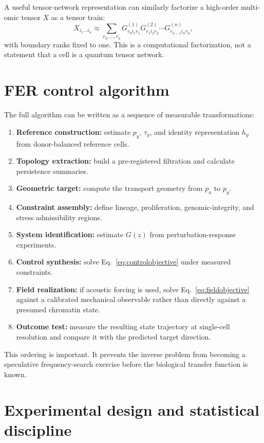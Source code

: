 \documentclass[11pt]{article}
\begin{document}
A useful tensor-network representation can similarly factorize a high-order multi-omic tensor $X$ as a tensor train:
\begin{equation}
 X_{i_1\ldots i_n}\approx\sum_{r_0,\ldots,r_n}G^{(1)}_{r_0i_1r_1}G^{(2)}_{r_1i_2r_2}\cdots G^{(n)}_{r_{n-1}i_nr_n},
\label{eq:tensortrain}
\end{equation}
with boundary ranks fixed to one. This is a computational factorization, not a statement that a cell is a quantum tensor network.

\section{FER control algorithm}
The full algorithm can be written as a sequence of measurable transformations:
\begin{enumerate}[leftmargin=1.45em]
\item \textbf{Reference construction:} estimate $p_y$, $\tau_y$, and identity representation $h_y$ from donor-balanced reference cells.
\item \textbf{Topology extraction:} build a pre-registered filtration and calculate persistence summaries.
\item \textbf{Geometric target:} compute the transport geometry from $p_a$ to $p_y$.
\item \textbf{Constraint assembly:} define lineage, proliferation, genomic-integrity, and stress admissibility regions.
\item \textbf{System identification:} estimate $G(z)$ from perturbation-response experiments.
\item \textbf{Control synthesis:} solve Eq.~\eqref{eq:controlobjective} under measured constraints.
\item \textbf{Field realization:} if acoustic forcing is used, solve Eq.~\eqref{eq:fieldobjective} against a calibrated mechanical observable rather than directly against a presumed chromatin state.
\item \textbf{Outcome test:} measure the resulting state trajectory at single-cell resolution and compare it with the predicted target direction.
\end{enumerate}

This ordering is important. It prevents the inverse problem from becoming a speculative frequency-search exercise before the biological transfer function is known.

\section{Experimental design and statistical discipline}
\end{document}
